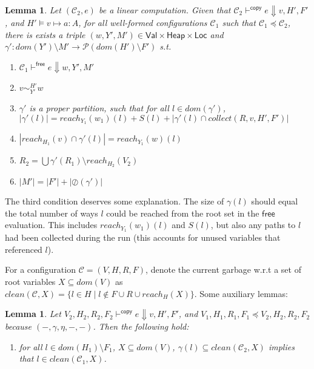 \documentclass{easychair}
\newcommand{\ms}[1]{\ensuremath{\mathsf{#1}}}
\newcommand{\veq}[4]{#3 \sim^{#1}_{#2} #4}
\newcommand{\oh}[1]{\oslash(#1)}
\newtheorem{lemma}[theorem]{Lemma}
\theoremstyle{definition}
\begin{document}
\begin{lemma}\label{itm:frugal}
	Let $(\mathcal{C}_2,e)$ be a linear computation. Given that 
	$\mathcal{C}_2 \vdash^{\mathsf{copy}} e \Downarrow v,H',F'$, and $H' \vDash v \mapsto a : A$, 
	for all well-formed configurations $\mathcal{C}_1$ such that $\mathcal{C}_1 \preceq \mathcal{C}_2$,
there is exists a triple
$(w,Y',M') \in \ms{Val} \times \ms{Heap} \times \ms{Loc}$ and 
	$\gamma' : dom(Y') \setminus M' \to \mathcal{P}(dom(H') \setminus F')$ s.t.
	\begin{enumerate}
			\item $\mathcal{C}_1 \vdash^{\mathsf{free}} e \Downarrow w,Y',M'$
			\item $\veq{H'}{Y'}{v}{w}$
			\item $\gamma'$ is a proper partition, such that for all $l \in dom(\gamma')$, 
				$|\gamma'(l)| = reach_{Y_1}(w_1)(l) + S(l) + |\gamma'(l) \cap collect(R,v,H',F')|$
			\item $|reach_{H_1}(v) \cap \gamma'(l)| = reach_{Y_1}(w)(l)$
			\item $R_2 = \bigcup \gamma'(R_1) \setminus reach_{H_2}(V_2)$ 
			\item $|M'| = |F'| + |\oh{\gamma'}|$
	\end{enumerate}
\end{lemma}

The third condition deserves some explanation. The size of $\gamma(l)$ should equal the total number 
of ways $l$ could be reached from the root set in the $\ms{free}$ evaluation. This includes 
$reach_{Y_1}(w_1)(l)$ and $S(l)$, but also any paths to $l$ had been collected during the run 
(this accounts for unused variables that referenced $l$).

For a configuration $\mathcal{C} = (V,H,R,F)$, denote the current garbage w.r.t a set of root variables 
$X \subseteq dom(V)$ 
as $clean(\mathcal{C},X) = \{l \in H \mid l \notin F \cup R \cup reach_H(X)\}$. Some auxiliary lemmas: 

\begin{lemma}\label{itm:aux}
Let $V_2,H_2,R_2,F_2 \vdash^{\mathsf{copy}} e \Downarrow v,H',F'$, and 
$V_1,H_1,R_1,F_1 \preceq V_2,H_2,R_2,F_2$ because $(-,\gamma,\eta,-,-)$. Then the following hold:
\begin{enumerate}
\item for all $l \in dom(H_1) \setminus F_1$, 
$X \subseteq dom(V)$, $\gamma(l) \subseteq clean(\mathcal{C}_2,X)$ implies that 
$l \in clean(\mathcal{C}_1,X)$.
\end{enumerate}
\end{lemma}
\end{document}
